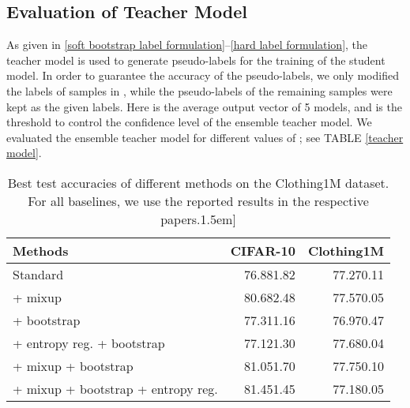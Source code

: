 \documentclass[conference]{IEEEtran}
\begin{document}
\begin{algorithm}[H]
\subsection{Evaluation of Teacher Model}
As given in \eqref{soft bootstrap label formulation}--\eqref{hard label formulation}, 
the teacher model is used to generate pseudo-labels for the training of the student model.
In order to guarantee the accuracy of the pseudo-labels, we only modified the labels of samples in , while the pseudo-labels of the remaining samples were kept as the given labels.
Here  is the average output vector of 5 models, and  is the threshold to control the confidence level of the ensemble teacher model.
We evaluated the ensemble teacher model for different values of ; see TABLE \ref{teacher model}.



\begin{table}[!tb]
\caption{Best test accuracies of different methods on the Clothing1M dataset. For all baselines, we use the reported results in the respective papers.\-1.5em]}
\label{ablation teacher}
\centering
\begin{tabular}{lrr}
\toprule
Methods  & CIFAR-10 & Clothing1M \\\midrule
Standard & 76.881.82   & 77.270.11  \\\midrule
+ mixup  & 80.682.48   & 77.570.05  \\\midrule
+ bootstrap    & 77.311.16   & 76.970.47 \\\midrule
+ entropy reg. + bootstrap & 77.121.30   & 77.680.04  \\\midrule
+ mixup + bootstrap    & 81.051.70   & 77.750.10 \\\midrule
+ mixup + bootstrap + entropy reg. & 81.451.45   &  77.180.05  \\
\bottomrule
\end{tabular}
\end{table}




\end{algorithm}
\end{document}
